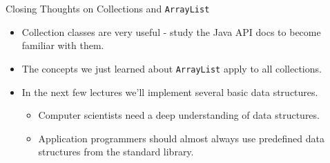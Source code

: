 \documentclass{beamer}
\begin{document}
\begin{frame}[fragile]{Closing Thoughts on Collections and {\tt ArrayList}}


\begin{itemize}
\item Collection classes are very useful - study the Java API docs to become familiar with them.
\item The concepts we just learned about {\tt ArrayList} apply to all collections.
\item In the next few lectures we'll implement several basic data structures.
\begin{itemize}
\item Computer scientists need a deep understanding of data structures.
\item Application programmers should almost always use predefined data structures from the standard library.
\end{itemize}
\end{itemize}


\end{frame}








\end{document}
